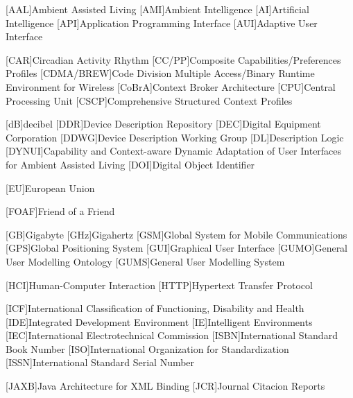 \begin{acronym}[dynui]
  [AAL]{Ambient Assisted Living}
  [AMI]{Ambient Intelligence} %
  [AI]{Artificial Intelligence}
  [API]{Application Programming Interface}
  [AUI]{Adaptive User Interface}
  
  [CAR]{Circadian Activity Rhythm}
  [CC/PP]{Composite Capabilities/Preferences Profiles}
  [CDMA/BREW]{Code Division Multiple Access/Binary Runtime Environment for Wireless}
  [CoBrA]{Context Broker Architecture}
  [CPU]{Central Processing Unit}
  [CSCP]{Comprehensive Structured Context Profiles}
  
  [dB]{decibel}
  [DDR]{Device Description Repository}
  [DEC]{Digital Equipment Corporation}
  [DDWG]{Device Description Working Group}
  [DL]{Description Logic}
  [DYNUI]{Capability and Context-aware Dynamic Adaptation of User Interfaces for Ambient Assisted Living}
  [DOI]{Digital Object Identifier}
  
  [EU]{European Union}
  
  [FOAF]{Friend of a Friend}
  
  [GB]{Gigabyte}
  [GHz]{Gigahertz}
  [GSM]{Global System for Mobile Communications}
  [GPS]{Global Positioning System}
  [GUI]{Graphical User Interface}
  [GUMO]{General User Modelling Ontology}
  [GUMS]{General User Modelling System}
  
  [HCI]{Human-Computer Interaction}
  [HTTP]{Hypertext Transfer Protocol}
  
  [ICF]{International Classification of Functioning, Disability and Health}
  [IDE]{Integrated Development Environment}
  [IE]{Intelligent Environments}
  [IEC]{International Electrotechnical Commission}
  [ISBN]{International Standard Book Number}
  [ISO]{International Organization for Standardization}
  [ISSN]{International Standard Serial Number}
  
  [JAXB]{Java Architecture for XML Binding}
  [JCR]{Journal Citacion Reports}
  

\end{acronym}
